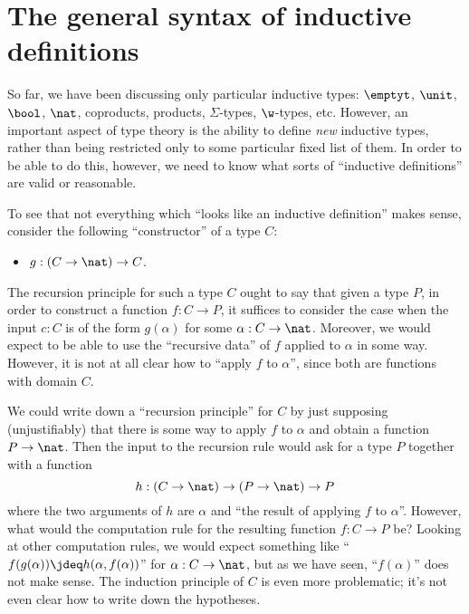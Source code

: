 
\section{The general syntax of inductive definitions}
\label{sec:strictly-positive}

%
%

So far, we have been discussing only particular inductive types: $\emptyt$, $\unit$, $\bool$, $\nat$, coproducts, products, $\Sigma$-types, $\w$-types, etc.
However, an important aspect of type theory is the ability to define \emph{new} inductive types, rather than being restricted only to some particular fixed list of them.
In order to be able to do this, however, we need to know what sorts of ``inductive definitions'' are valid or reasonable.

To see that not everything which ``looks like an inductive definition'' makes sense, consider the following ``constructor'' of a type $C$:
\begin{itemize}
\item $g:(C\to \nat) \to C$.
\end{itemize}
The recursion principle for such a type $C$ ought to say that given a type $P$, in order to construct a function $f:C\to P$, it suffices to consider the case when the input $c:C$ is of the form $g(\alpha)$ for some $\alpha:C\to\nat$.
Moreover, we would expect to be able to use the ``recursive data'' of $f$ applied to $\alpha$ in some way.
However, it is not at all clear how to ``apply $f$ to $\alpha$'', since both are functions with domain $C$.

We could write down a ``recursion principle'' for $C$ by just supposing (unjustifiably) that there is some way to apply $f$ to $\alpha$ and obtain a function $P\to\nat$.
Then the input to the recursion rule would ask for a type $P$ together with a function
\begin{equation}
  h:(C\to\nat) \to (P\to\nat) \to P\label{eq:fake-recursor}
\end{equation}
where the two arguments of $h$ are $\alpha$ and ``the result of applying $f$ to $\alpha$''.
However, what would the computation rule for the resulting function $f:C\to P$ be?
Looking at other computation rules, we would expect something like ``$f(g(\alpha)) \jdeq h(\alpha,f(\alpha))$'' for $\alpha:C\to\nat$, but as we have seen, ``$f(\alpha)$'' does not make sense.
The induction principle of $C$ is even more problematic; it's not even clear how to write down the hypotheses.

